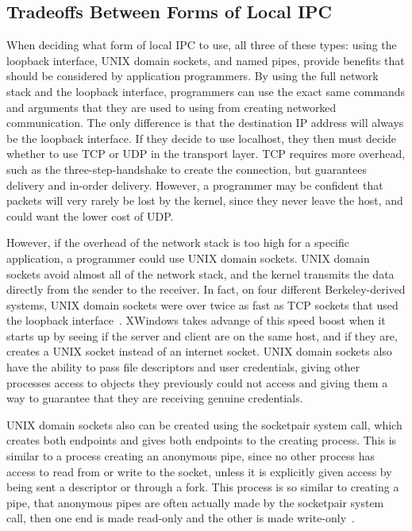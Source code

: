 \subsection{Tradeoffs Between Forms of Local IPC}
When deciding what form of local IPC to use, all three of these types: using the loopback interface, UNIX domain sockets, and named pipes, provide benefits that should be considered by application programmers.  By using the full network stack and the loopback interface, programmers can use the exact same commands and arguments that they are used to using from creating networked communication.  The only difference is that the destination IP address will always be the loopback interface.  If they decide to use localhost, they then must decide whether to use TCP or UDP in the transport layer.  TCP requires more overhead, such as the three-step-handshake to create the connection, but guarantees delivery and in-order delivery.  However, a programmer may be confident that packets will very rarely be lost by the kernel, since they never leave the host, and could want the lower cost of UDP.

However, if the overhead of the network stack is too high for a specific application, a programmer could use UNIX domain sockets.  UNIX domain sockets avoid almost all of the network stack, and the kernel transmits the data directly from the sender to the receiver.  In fact, on four different Berkeley-derived systems, UNIX domain sockets were over twice as fast as TCP sockets that used the loopback interface~\cite[223--224]{Stevens:1997:UNP:522800}.  XWindows takes advange of this speed boost when it starts up by seeing if the server and client are on the same host, and if they are, creates a UNIX socket instead of an internet socket.  UNIX domain sockets also have the ability to pass file descriptors and user credentials, giving other processes access to objects they previously could not access and giving them a way to guarantee that they are receiving genuine credentials.

UNIX domain sockets also can be created using the socketpair system call, which creates both endpoints and gives both endpoints to the creating process.  This is similar to a process creating an anonymous pipe, since no other process has access to read from or write to the socket, unless it is explicitly given access by being sent a descriptor or through a fork.  This process is so similar to creating a pipe, that anonymous pipes are often actually made by the socketpair system call, then one end is made read-only and the other is made write-only~\cite[253]{Stevens:1996:TIT:233130}.

